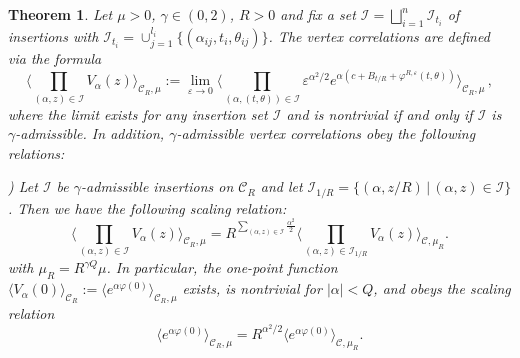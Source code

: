 \documentclass[10pt,a4paper]{amsart}
\newtheorem{theorem}{Theorem}
\newcommand{\cjd}{\rangle}
\newcommand{\cjg}{\langle}
\def\eps{\varepsilon}
\newcommand{\mc}{\mathcal}
\begin{document}
\begin{theorem} \label{thm: sinh correlations}
Let $\mu>0$, $\gamma\in (0,2)$, $R>0$ and fix a set $\mathcal{I}=\bigsqcup_{i=1}^n\mc{I}_{t_i}$ of insertions with $\mathcal{I}_{t_i}= \cup_{j=1}^{l_i} \lbrace   (\alpha_{ij},t_i, \theta_{ij}) \rbrace$. The vertex correlations are defined via the formula
\[\Big\cjg \prod_{(\alpha,z)\in \mc{I}}V_{\alpha}(z)\Big\cjd_{\mc{C}_R,\mu} :=\lim_{\eps\to 0}
\Big\langle \prod_{(\alpha, (t, \theta)) \in \mathcal{I}}\eps^{\alpha^2/2}e^{\alpha (c+ B_{t/R} +  \varphi^{R,\eps}(t,\theta)) } \Big\rangle_{\mc{C}_R,\mu}\, ,
\]
where the limit exists for any insertion set $\mathcal I$ and is nontrivial if and only if $\mathcal{I}$ is $\gamma$-admissible. In addition, $\gamma$-admissible vertex correlations obey the following relations:
\vspace{3mm}

) Let $\mathcal{I}$ be $\gamma$-admissible insertions on $\mc{C}_R$ and let $\mathcal{I}_{1/R} = \{ (\alpha, z/R) \,|\, (\alpha,z) \in \mathcal{I} \}$. Then we have the following scaling relation: 
\begin{equation}\label{scale invariance}
\Big\cjg \prod_{(\alpha,z)\in \mc{I}}V_{\alpha}(z)\Big\cjd_{\mc{C}_R,\mu} 
=
R^{\sum_{(\alpha,z) \in \mathcal{I}} \frac{\alpha^2}{2} }
\Big\cjg \prod_{(\alpha,z)\in \mc{I}_{1/R}}V_{\alpha}(z)\Big\cjd_{\mc{C},\mu_R}.
\end{equation}
with $\mu_R=R^{\gamma Q}\mu$.
 In particular, the one-point function $\langle V_\alpha(0) \rangle_{\mathcal C_R}:=\langle e^{\alpha \varphi(0)} \rangle_{\mc{C}_R,\mu}$ exists, is nontrivial for $|\alpha|<Q$, and obeys the scaling relation
\begin{equation} \label{one-pt}
\langle e^{\alpha \varphi(0)} \rangle_{\mc{C}_R,\mu}
=
R^{\alpha^2/2} \langle e^{\alpha \varphi(0)} \rangle_{\mc{C},\mu_R}.	
\end{equation}
\vspace{2mm}


\end{theorem}
\end{document}
